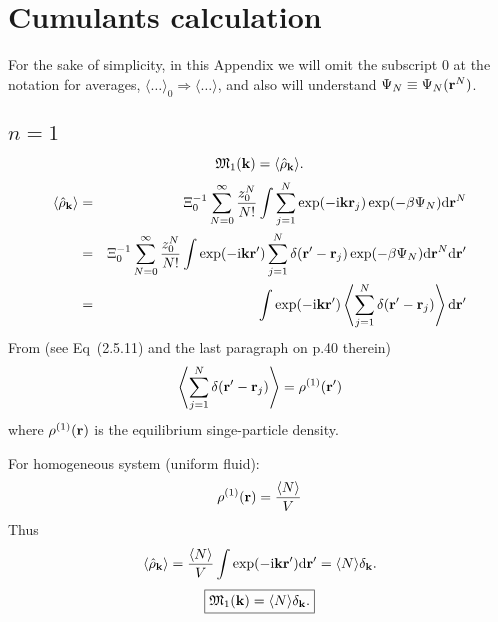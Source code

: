 \section{\label{app:cumulant_calc}Cumulants calculation}
For the sake of simplicity, in this Appendix we will omit the subscript $0$ at the notation for averages, $\langle\dotsc\rangle_0 \Rightarrow  \langle\dotsc\rangle$, and also will understand $\Psi_N \equiv\Psi_N(\vb r^N)$.
\subsection{$n=1$}
\begin{equation}
	\mathfrak{M}_1(\vb k) = \langle \hat{\rho}_{\vb k} \rangle.
\end{equation}
\begin{eqnarray}
	\langle \hat{\rho}_{\vb k} \rangle &=& \Xi_0^{-1} \sum_{N=0}^{\infty} \frac{z_0^N}{N!} \int \sum_{j=1}^N \exp(-{\rm i}\vb k\vb r_j) \exp(-\beta\Psi_N) {\rm d} {\vb r}^N 
	\nonumber\\
	&=&\Xi_0^{-1} \sum_{N=0}^{\infty} \frac{z_0^N}{N!} \int \exp(-{\rm i}\vb k\vb{r}') \sum_{j=1}^N \delta(\vb r' - \vb r_j) \exp(-\beta\Psi_N) {\rm d} {\vb r}^N {\rm d}{\vb r'}
	\nonumber\\
	&=&\int \exp(-{\rm i}\vb k\vb{r}') \left\langle \sum_{j=1}^N \delta(\vb r' - \vb r_j) \right\rangle {\rm d}{\vb r'}
\end{eqnarray}
From \cite{HANSEN2013ch2} (see Eq~(2.5.11) and the last paragraph on p.40 therein)
\begin{equation}
	\left\langle \sum_{j=1}^N \delta(\vb r' - \vb r_j) \right\rangle = \rho^{(1)}(\vb r')
\end{equation}
where $\rho^{(1)}(\vb r)$ is the equilibrium singe-particle density.

For homogeneous system (uniform fluid):
\begin{equation}
	\rho^{(1)}(\vb r) = \frac{\langle N\rangle}{V}
\end{equation}
Thus
\begin{equation}
	\langle \hat{\rho}_{\vb k} \rangle = \frac{\langle N\rangle }{V} \int \exp(-{\rm i}\vb k \vb r') {\rm d} \vb r' = \langle N\rangle \delta_{\vb k}.
\end{equation}
\begin{equation}
	\boxed{
		\mathfrak{M}_1(\vb k) = \langle N\rangle \delta_{\vb k}.
	}
\end{equation}

